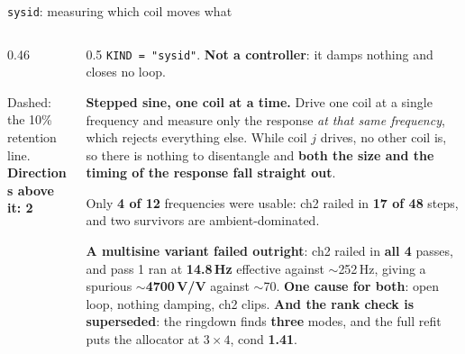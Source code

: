 \documentclass[aspectratio=169]{beamer}
\begin{document}
\begin{frame}{\texttt{sysid}: measuring which coil moves what}
  \begin{columns}[T]
    \begin{column}{0.46\textwidth}
      \centering
      \\
      {\scriptsize Dashed: the 10\% retention line.
       \textbf{Directions above it: 2}}
    \end{column}
    \begin{column}{0.5\textwidth}
      \footnotesize
      \texttt{KIND = "sysid"}. \textbf{Not a controller}: it damps nothing and
      closes no loop.

      \vspace{1.5mm}
      \textbf{Stepped sine, one coil at a time.} Drive one coil at a single
      frequency and measure only the response \emph{at that same frequency},
      which rejects everything else. While coil $j$ drives, no other coil is, so
      there is nothing to disentangle and \textbf{both the size and the timing of
      the response fall straight out}.

      \vspace{1.5mm}
      Only \textbf{4 of 12} frequencies were usable: ch2 railed in
      \textbf{17 of 48} steps, and two survivors are ambient-dominated.

      \vspace{1.5mm}
      \textbf{A multisine variant failed outright}: ch2 railed in \textbf{all 4}
      passes, and pass 1 ran at \textbf{14.8\,Hz} effective against
      $\sim$252\,Hz, giving a spurious $\sim$\textbf{4700\,V/V} against
      $\sim$70. \textbf{One cause for both}: open loop, nothing damping, ch2
      clips.
      \textbf{And the rank check is superseded}: the ringdown finds
      \textbf{three} modes, and the full refit puts the allocator at
      $3 \times 4$, cond \textbf{1.41}.
    \end{column}
  \end{columns}
\end{frame}
\end{document}
